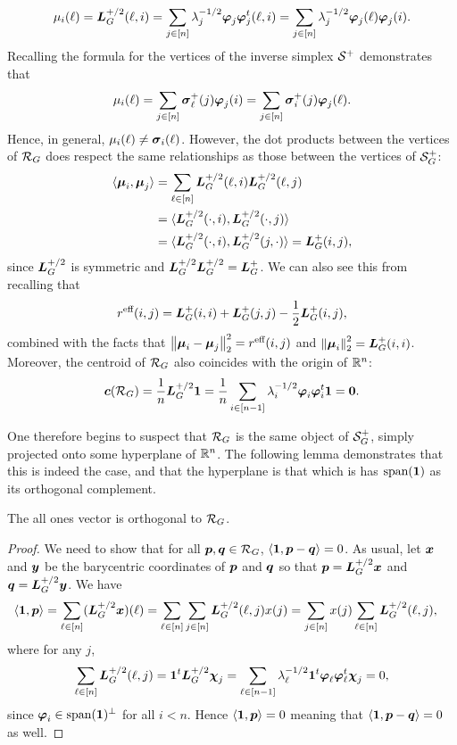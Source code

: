 \begin{align*}
\mu_i(\ell) = \vb*{L}_G^{+/2}(\ell,i) = \sum_{j\in[n]}\lambda_j^{-1/2}\vb*{\varphi}_j\vb*{\varphi}_j^t(\ell,i) = \sum_{j\in[n]}\lambda_j^{-1/2}\vb*{\varphi}_j(\ell)\vb*{\varphi}_j(i).
\end{align*}
Recalling the formula for the vertices of the inverse simplex $\mathcal{S}^+$ demonstrates that 
\begin{equation*}
\mu_i(\ell) = \sum_{j\in[n]}\vb*{\sigma}_\ell^+(j)\vb*{\varphi}_j(i) = \sum_{j\in[n]}\vb*{\sigma}_i^+(j)\vb*{\varphi}_j(\ell).
\end{equation*}
Hence, in general, $\mu_i(\ell)\neq \vb*{\sigma}_i(\ell)$. However, the dot products between the vertices of $\mathcal{R}_G$ does respect  the same relationships as those between the vertices of $\mathcal{S}_G^+$:
\begin{align*}
\langle \vb*{\mu}_i,\vb*{\mu}_j\rangle &=\sum_{\ell\in[n]} \vb*{L}_G^{+/2}(\ell,i)\vb*{L}_G^{+/2}(\ell,j) \\
&= \langle \vb*{L}_G^{+/2}(\cdot,i),\vb*{L}_G^{+/2}(\cdot,j)\rangle \\
&=\langle \vb*{L}_G^{+/2}(\cdot,i),\vb*{L}_G^{+/2}(j,\cdot)\rangle= \vb*{L}_G^+(i,j),
\end{align*}
since $\vb*{L}_G^{+/2}$ is symmetric and  $\vb*{L}_G^{+/2}\vb*{L}_G^{+/2}=\vb*{L}_G^+$.  We can also see this from recalling that 
\[r^{\text{eff}}(i,j) = \vb*{L}_G^+(i,i) + \vb*{L}_G^+(j,j) - \frac{1}{2}\vb*{L}_G^+(i,j),\]
combined with the facts that $\norm{\vb*{\mu}_i-\vb*{\mu}_j}_2^2 = r^{\text{eff}}(i,j)$ and $\norm{\vb*{\mu}_i}_2^2 = \vb*{L}_G^+(i,i)$. Moreover, the centroid of $\mathcal{R}_G$ also coincides with the origin  of $\mathbb{R}^n$: 
\begin{equation*}
\vb*{c}(\mathcal{R}_G) = \frac{1}{n}\vb*{L}_G^{+/2}\vb{1} = \frac{1}{n}\sum_{i\in[n-1]}\lambda_i^{-1/2}\vb*{\varphi}_i\vb*{\varphi}_i^t \vb{1} = \vb{0}.
\end{equation*}

One therefore begins to suspect that $\mathcal{R}_G$ is the same object of  $\mathcal{S}_G^+$, simply projected onto some hyperplane of $\mathbb{R}^n$. The following lemma  demonstrates that this is indeed the  case, and  that  the hyperplane  is that which is has $\textnormal{span}(\vb{1})$ as its orthogonal complement.  

\begin{lemma}
	The all ones vector is orthogonal to $\mathcal{R}_G$. 
\end{lemma}
\begin{proof}
	We need to show that for all $\vb*{p},\vb*{q}\in\mathcal{R}_G$, $\langle \vb{1},\vb*{p}-\vb*{q}\rangle=0$. As usual, let $\vb*{x}$ and $\vb*{y}$ be the barycentric coordinates of $\vb*{p}$ and $\vb*{q}$ so that $\vb*{p}=\vb*{L}_G^{+/2}\vb*{x}$ and $\vb*{q}=\vb*{L}_G^{+/2}\vb*{y}$. We have
	\begin{align*}
	\langle \vb{1},\vb*{p}\rangle &= \sum_{\ell\in[n]} (\vb*{L}_G^{+/2}\vb*{x})(\ell) = \sum_{\ell\in[n]} \sum_{j\in [n]}\vb*{L}_G^{+/2}(\ell,j)x(j) = \sum_{j\in[n]}x(j) \sum_{\ell\in[n]}\vb*{L}_G^{+/2}(\ell,j),
	\end{align*}
	where for any $j$, 
	\[\sum_{\ell\in[n]}\vb*{L}_G^{+/2}(\ell,j)= \vb{1}^t \vb*{L}_G^{+/2}\boldsymbol{\chi}_j=\sum_{\ell\in[n-1]} \lambda_\ell^{-1/2}\vb{1}^t \vb*{\varphi}_\ell\vb*{\varphi}_\ell^t\boldsymbol{\chi}_j=0,\]
	since $\vb*{\varphi}_i\in\textnormal{span}(\vb{1})^\perp$  for all $i<n$. Hence  $\langle \vb{1},\vb*{p}\rangle=0$ meaning that $\langle \vb{1},\vb*{p}-\vb*{q}\rangle=0$ as well. 
\end{proof}

